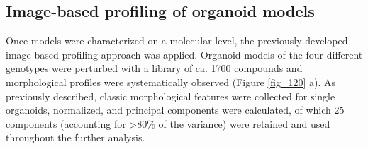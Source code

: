 \begin{flushleft}
\clearpage
\newpage
\section{Image-based profiling of organoid models}

Once models were characterized on a molecular level, the previously developed image-based profiling approach was applied. Organoid models of the four different genotypes were perturbed with a library of ca. 1700 compounds and morphological profiles were systematically observed (Figure \ref{fig_120} a). As previously described, classic morphological features were collected for single organoids, normalized, and principal components were calculated, of which 25 components (accounting for >80\% of the variance) were retained and used throughout the further analysis. 


\end{flushleft}
